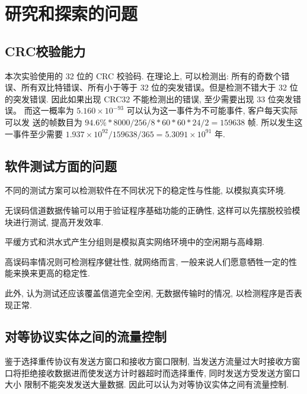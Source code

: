 \section{研究和探索的问题}

\subsection{CRC校验能力}

本次实验使用的 32 位的 CRC 校验码. 在理论上, 可以检测出: 所有的奇数个错
误、所有双比特错误、所有小于等于 32 位的突发错误。但是检测不错大于 32 位的突发错误.
因此如果出现 CRC32 不能检测出的错误, 至少需要出现 33 位突发错误。
而这一概率为 $5.160 \times 10^{-93}$ 可以认为这一事件为不可能事件, 客户每天实际可以发
送的帧数目为 $94.6\% * 8000 / 256 / 8 * 60 * 60 * 24 / 2 = 159638$ 帧.
所以发生这一事件至少需要 $ 1.937 \times 10^{92} / 159638 / 365 = 5.3091 \times 10^{91}$ 年.


\subsection{软件测试方面的问题}

\par 不同的测试方案可以检测软件在不同状况下的稳定性与性能, 以模拟真实环境.
\par 无误码信道数据传输可以用于验证程序基础功能的正确性, 这样可以先摆脱校验模块进行测试, 提高开发效率.
\par 平缓方式和洪水式产生分组则是模拟真实网络环境中的空闲期与高峰期.
\par 高误码率情况则可检测程序健壮性, 就网络而言, 一般来说人们愿意牺牲一定的性能来换来更高的稳定性.
\par 此外, 认为测试还应该覆盖信道完全空闲, 无数据传输时的情况, 以检测程序是否表现正常.


\subsection{对等协议实体之间的流量控制}

\par 鉴于选择重传协议有发送方窗口和接收方窗口限制, 当发送方流量过大时接收方窗
口将拒绝接收数据进而使发送方计时器超时而选择重传, 同时发送方受发送方窗口大小
限制不能突发发送大量数据. 因此可以认为对等协议实体之间有流量控制.